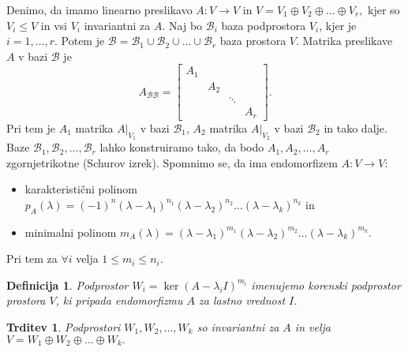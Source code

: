 \documentclass[10pt, a4paper]{article}
\newtheorem{trditev}[izr]{Trditev}
\newtheorem{defi}{Definicija}[section]
\newenvironment{noticeB}{%
  \tcolorbox[%
  notitle,
  empty,
  enhanced,  %
  breakable,
  coltext=black,
  colback=white, 
  fontupper=\rmfamily,
  parbox=false,
  noparskip,
  sharp corners,
  boxrule=-1pt,  %
  frame hidden,
  left=7pt,  %
  right=7pt,
  top=5pt,
  bottom=5pt,
  before skip=2.5ex plus 2pt,
  after skip=2.5ex plus 2pt,
  borderline west = {1.5pt}{-0.1pt}{blue!30!black}, %
  overlay unbroken and last={%
    \draw[color=black, line width=1.25pt]
    ($(frame.south west)+(1.pt, -0.1pt)$) -- ++(2em, 0);
  }
  ]}
{\endtcolorbox}
\newenvironment{definicija}{\begin{defi}\begin{noticeB}}{%
    \end{noticeB}\end{defi}}
\begin{document}
Denimo, da imamo linearno preslikavo $A: V \rightarrow V$ in $V = V_1 \oplus V_2 \oplus \dots \oplus V_r,$
kjer so $V_i \leq V$ in vsi $V_i$ invariantni za $A$.
Naj bo $\mathcal{B}_i$ baza podprostora $V_i$, kjer je $i = 1,\dots, r$.
Potem je $\mathcal{B} = \mathcal{B}_1 \cup \mathcal{B}_2 \cup \dots \cup \mathcal{B}_r$ baza prostora $V$.
Matrika preslikave $A$ v bazi $\mathcal{B}$ je 
$$A_\mathcal{BB} = \begin{bmatrix}
    A_1 & & & \\
    & A_2 & & \\
    & & \ddots & \\
    & & & A_r
\end{bmatrix}.$$
Pri tem je $A_1$ matrika $A \big|_{V_1}$ v bazi $\mathcal{B}_1$, $A_2$ matrika $A \big|_{V_2}$ v bazi $\mathcal{B}_2$ in tako dalje.
Baze $\mathcal{B}_1, \mathcal{B}_2, \dots, \mathcal{B}_r$ lahko konstruiramo tako, da bodo $A_1, A_2, \dots, A_r$ zgornjetrikotne (Schurov izrek).
Spomnimo se, da ima endomorfizem $A: V \rightarrow V$:
\begin{itemize}
    \item karakteristični polinom $p_A (\lambda) = (-1)^n (\lambda - \lambda_1)^{n_1} (\lambda - \lambda_2)^{n_2} \dots (\lambda - \lambda_k)^{n_k}$ in 
    \item minimalni polinom $m_A (\lambda) = (\lambda - \lambda_1)^{m_1} (\lambda - \lambda_2)^{m_2} \dots (\lambda - \lambda_k)^{m_k}.$
\end{itemize}
Pri tem za $\forall i$ velja $1 \leq m_i \leq n_i$.

\begin{definicija}
    Podprostor $W_i = \ker (A - \lambda_i I)^{m_i}$ imenujemo korenski podprostor prostora $V$, ki pripada endomorfizmu $A$ za lastno vrednost $I$.
\end{definicija}

\begin{trditev}
    Podprostori $W_1, W_2, \dots, W_k$ so invariantni za $A$ in velja $V = W_1 \oplus W_2 \oplus \dots \oplus W_k.$
\end{trditev}
\end{document}
